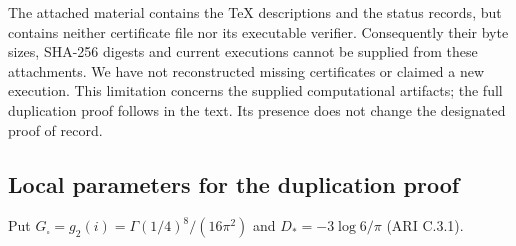 The attached material contains the TeX descriptions and the status records, but contains neither certificate file nor its executable verifier. Consequently their byte sizes, SHA-256 digests and current executions cannot be supplied from these attachments. We have not reconstructed missing certificates or claimed a new execution. This limitation concerns the supplied computational artifacts; the full duplication proof follows in the text. Its presence does not change the designated proof of record.

\subsection{Local parameters for the duplication proof}
Put $G_\square=g_2(i)=\Gamma(1/4)^8/(16\pi^2)$ and $D_*=-3\log6/\pi$ (ARI C.3.1).

